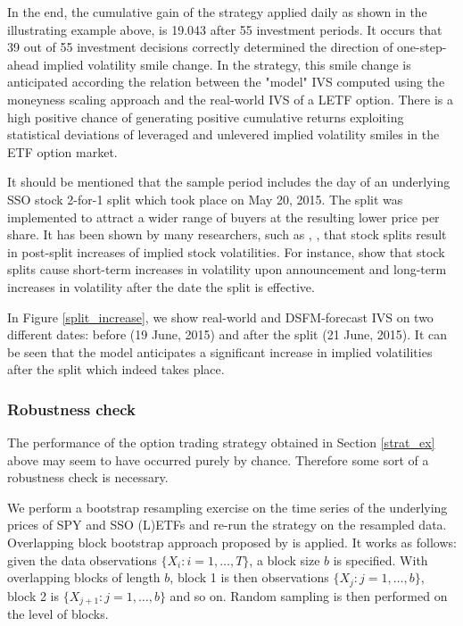 \documentclass{rQUF2e}
\theoremstyle{plain}
\theoremstyle{definition}
\begin{document}
	In the end, the cumulative gain of the strategy applied daily as shown in the illustrating example above, is 19.043 after 55 investment periods. It occurs that 39 out of 55 investment decisions correctly determined the direction of one-step-ahead implied volatility smile change. In the strategy, this smile change is anticipated according the relation between the "model" IVS computed using the moneyness scaling approach and the real-world IVS of a LETF option. There is a high positive chance of generating positive cumulative returns exploiting statistical deviations of leveraged and unlevered implied volatility smiles in the ETF option market.
	
	It should be mentioned that the sample period includes the day of an underlying SSO stock 2-for-1 split which took place on May 20, 2015. The split was implemented to attract a wider range of buyers at the resulting lower price per share. It has been shown by many researchers, such as \citet{ohlson_penman}, \citet{aamir_sheikh}, \citet{desai_nimalendran} that stock splits result in post-split increases of implied stock volatilities. For instance, \citet{ohlson_penman} show that stock splits cause short-term increases in volatility upon announcement and long-term increases in volatility after the date the split is effective.
	
	In Figure \ref{split_increase}, we show real-world and DSFM-forecast IVS on two different dates: before (19 June, 2015) and after the split (21 June, 2015). It can be seen that the model anticipates a significant increase in implied volatilities after the split which indeed takes place. 
	
	
	\subsubsection{Robustness check}
	The performance of the option trading strategy obtained in Section \ref{strat_ex} above may seem to have occurred purely by chance. Therefore some sort of a robustness check is necessary.
	
	We perform a bootstrap resampling exercise on the time series of the underlying prices of SPY and SSO (L)ETFs and re-run the strategy on the resampled data. Overlapping block bootstrap approach proposed by \citet{kuensch} is applied. It works as follows: given the data observations $\{X_i: i = 1,\ldots,T\}$, a block size $b$ is specified. With overlapping blocks of length $b$, block 1 is then observations $\{X_j: j = 1,\ldots,b\}$, block 2 is $\{X_{j+1}: j = 1,\ldots,b\}$ and so on. Random sampling is then performed on the level of blocks.
	
\end{document}
